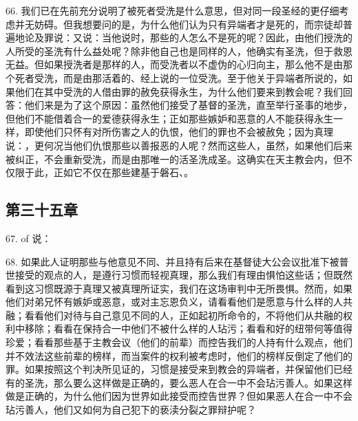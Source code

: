 66. 我们已在先前充分说明了被死者受洗是什么意思，但对同一段圣经的更仔细考虑并无妨碍。但我想要问的是，为什么他们认为只有异端者才是死的，而宗徒却普遍地论及罪说：又说：当他说时，那些的人怎么不是死的呢？因此，由他们授洗的人所受的圣洗有什么益处呢？除非他自己也是同样的人，他确实有圣洗，但于救恩无益。但如果授洗者是那样的人，而受洗者以不虚伪的心归向主，那么他不是由那个死者受洗，而是由那活着的、经上说的一位受洗。至于他关于异端者所说的，如果他们在其中受洗的人借由罪的赦免获得永生，为什么他们要来到教会呢？我们回答：他们来是为了这个原因：虽然他们接受了基督的圣洗，直至举行圣事的地步，但他们不能借着合一的爱德获得永生；正如那些嫉妒和恶意的人不能获得永生一样，即使他们只怀有对所伤害之人的仇恨，他们的罪也不会被赦免；因为真理说：，更何况当他们仇恨那些以善报恶的人呢？然而这些人，虽然，如果他们后来被纠正，不会重新受洗，而是由那唯一的活圣洗成圣。这确实在天主教会内，但不仅限于此，正如它不仅在那些建基于磐石、。\par


\subsection{第三十五章}

67.  of 说：\par

68. 如果此人证明那些与他意见不同、并且持有后来在基督徒大公会议批准下被普世接受的观点的人，是遵行习惯而轻视真理，那么我们有理由惧怕这些话；但既然看到这习惯既源于真理又被真理所证实，我们在这场审判中无所畏惧。然而，如果他们对弟兄怀有嫉妒或恶意，或对主忘恩负义，请看看他们是愿意与什么样的人共融；看看他们对待与自己意见不同的人，正如起初所命令的，不将他们从共融的权利中移除；看看在保持合一中他们不被什么样的人玷污；看看和好的纽带何等值得珍爱；看看那些基于主教会议（他们的前辈）而控告我们的人持有什么观点，他们并不效法这些前辈的榜样，而当案件的权利被考虑时，他们的榜样反倒定了他们的罪。如果按照这个判决所见证的，习惯是接受来到教会的异端者，并保留他们已经有的圣洗，那么要么这样做是正确的，要么恶人在合一中不会玷污善人。如果这样做是正确的，为什么他们因为世界如此接受而控告世界？但如果恶人在合一中不会玷污善人，他们又如何为自己犯下的亵渎分裂之罪辩护呢？\par

